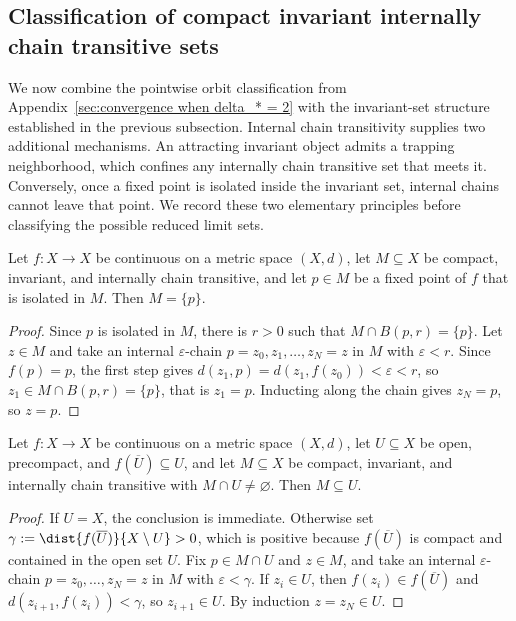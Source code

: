 \documentclass{article}
\begin{document}
\subsection{Classification of compact invariant internally chain transitive sets}
\label{subsec:ict_classification}

We now combine the pointwise orbit classification from
Appendix~\ref{sec:convergence when delta_* = 2} with the invariant-set
structure established in the previous subsection. Internal chain transitivity
supplies two additional mechanisms. An attracting invariant object admits a
trapping neighborhood, which confines any internally chain transitive set that
meets it. Conversely, once a fixed point is isolated inside the invariant set,
internal chains cannot leave that point. We record these two elementary
principles before classifying the possible reduced limit sets.

\begin{lemma}
\label{lem:frozen_chain}
Let $f\colon X\to X$ be continuous on a metric space $(X,d)$, let $M\subseteq X$
be compact, invariant, and internally chain transitive, and let $p\in M$ be a
fixed point of $f$ that is isolated in $M$. Then
$M=\{p\}$.
\end{lemma}

\begin{proof}
Since $p$ is isolated in $M$, there is $r>0$ such that $M\cap B(p,r)=\{p\}$.
Let $z\in M$ and take an internal $\varepsilon$-chain
$p=z_0,z_1,\dots,z_N=z$ in $M$ with $\varepsilon<r$. Since $f(p)=p$, the first
step gives $d(z_1,p)=d(z_1,f(z_0))<\varepsilon<r$, so
$z_1\in M\cap B(p,r)=\{p\}$, that is $z_1=p$. Inducting along the chain gives
$z_N=p$, so $z=p$.
\end{proof}

\begin{lemma}
\label{lem:trapping_confines_chains}
Let $f\colon X\to X$ be continuous on a metric space $(X,d)$, let $U\subseteq X$
be open, precompact, and $f(\overline U)\subseteq U$, and let
$M\subseteq X$ be compact, invariant, and internally chain transitive with
$M\cap U\ne\varnothing$. Then $M\subseteq U$.
\end{lemma}

\begin{proof}
If $U=X$, the conclusion is immediate. Otherwise set
$\gamma:=\dist{f(\overline U)}{X\setminus U}>0$, which is positive because
$f(\overline U)$ is compact and contained in the open set $U$. Fix
$p\in M\cap U$ and $z\in M$, and take an internal $\varepsilon$-chain
$p=z_0,\dots,z_N=z$ in $M$ with $\varepsilon<\gamma$. If $z_i\in U$, then
$f(z_i)\in f(\overline U)$ and $d(z_{i+1},f(z_i))<\gamma$, so $z_{i+1}\in U$.
By induction $z=z_N\in U$.
\end{proof}
\end{document}
